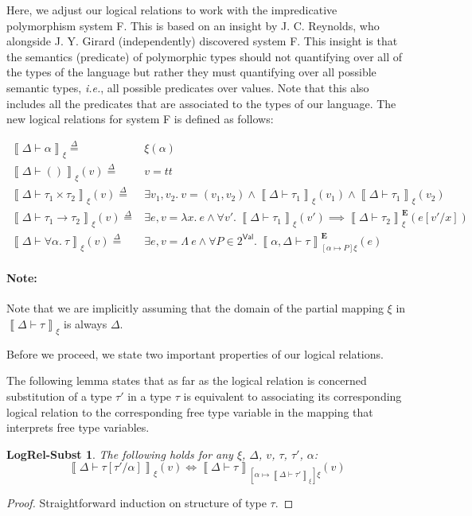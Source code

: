 \documentclass{article}
\newcommand{\ie}{\textit{i.e.}}
\newcommand{\TT}{\mathit{tt}}
\newcommand{\VAL}{\mathsf{Val}}
\newcommand{\UNT}{()}
\newcommand{\defeq}{\overset{\Delta}{=}}
\newcommand{\pred}{P}
\newcommand{\semtyp}[3]{\left\llbracket #2 \vdash #3 \right\rrbracket_{#1}}
\newcommand{\semErel}[1]{#1^{\textbf{E}}}
\newcommand{\semenv}{\xi}
\newcommand{\TLam}{\Lambda}
\newcommand{\CtxTps}{\Delta}
\newcommand{\expr}{e}
\newcommand{\val}{v}
\newcommand{\var}{x}
\newcommand{\typ}{\tau}
\newcommand{\tvar}{\alpha}
\begin{document}
Here, we adjust our logical relations to work with the impredicative polymorphism system F.
This is based on an insight by J. C. Reynolds, who alongside J. Y. Girard (independently) discovered system F.
This insight is that the semantics (predicate) of polymorphic types should not quantifying over all of the types of the language but rather
they must quantifying over all possible semantic types, \ie{}, all possible predicates over values.
Note that this also includes all the predicates that are associated to the types of our language.
The new logical relations for system F is defined as follows:

\begin{align*}
\semtyp{\semenv}{\CtxTps}{\tvar} \defeq{}& \semenv(\tvar)\\
\semtyp{\semenv}{\CtxTps}{\UNT}(\val) \defeq{}& v = \TT\\
\semtyp{\semenv}{\CtxTps}{\typ_1 \times \typ_2}(\val) \defeq{}& \exists \val_1, \val_2.~\val = (\val_1, \val_2) \land
\semtyp{\semenv}{\CtxTps}{\typ_1}(\val_1) \land \semtyp{\semenv}{\CtxTps}{\typ_1}(\val_2)\\
\semtyp{\semenv}{\CtxTps}{\typ_1 \to \typ_2}(\val) \defeq{}& \exists \expr, \val = \lambda \var.~\expr \land
\forall \val'.~\semtyp{\semenv}{\CtxTps}{\typ_1}(\val') \implies \semErel{\semtyp{\semenv}{\CtxTps}{\typ_2}}(\expr[\val'/\var])\\
\semtyp{\semenv}{\CtxTps}{\forall \tvar.~\typ}(\val) \defeq{}& \exists \expr, \val = \TLam~\expr\land
\forall \pred \in 2^{\VAL}.~\semErel{\semtyp{[\tvar \mapsto \pred]\semenv}{\tvar, \CtxTps}{\typ}}(\expr)
\end{align*}

\paragraph{Note:} Note that we are implicitly assuming that the domain of the partial mapping $\semenv$ in $\semtyp{\semenv}{\CtxTps}{\typ}$ is always $\CtxTps$.

Before we proceed, we state two important properties of our logical relations.

The following lemma states that as far as the logical relation is concerned substitution of a type $\typ'$ in a type $\typ$ is equivalent to associating its corresponding logical relation to the corresponding free type variable in the mapping that interprets free type variables.
\newtheorem*{logrelsubst}{LogRel-Subst}
\begin{logrelsubst}
  \makeatletter{}\makeatother
  \label{lem:logrelsubst}
  The following holds for any $\semenv$, $\CtxTps$, $\val$, $\typ$, $\typ'$, $\tvar$:
  \[ \semtyp{\semenv}{\CtxTps}{\typ[\typ'/\tvar]}(\val) \iff \semtyp{[\tvar \mapsto \semtyp{\semenv}{\CtxTps}{\typ'}]\semenv}{\CtxTps}{\typ}(\val) \]
\end{logrelsubst}
\begin{proof}
Straightforward induction on structure of type $\typ$.
\end{proof}
\end{document}
